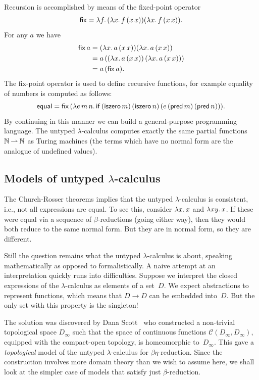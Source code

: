 %
Recursion is accomplished by means of the fixed-point operator
%
\begin{equation*}
  \mathsf{fix} = \lambda f .\,(\lambda x .\,f\,(x\,x)) (\lambda x .\,f\,(x\,x)).
\end{equation*}
%
For any $a$ we have
%
\begin{align*}
  \mathsf{fix}\,a &=
  (\lambda x .\,a\,(x\,x)) (\lambda x .\,a\,(x\,x)) \\
  &= a\,((\lambda x .\,a\,(x\,x))\,(\lambda x .\,a\,(x\,x))) \\
  &= a\,(\mathsf{fix}\,a).
\end{align*}
%
The fix-point operator is used to define recursive functions, for
example equality of numbers is computed as follows:
%
\begin{equation*}
  \mathsf{equal} = \mathsf{fix}\,(\lambda e\,m\,n .\,
    \mathsf{if}\,
    (\mathsf{iszero}\,m)\,
    (\mathsf{iszero}\,n)\,
    (e\,(\mathsf{pred}\,m)\,(\mathsf{pred}\,n))).
\end{equation*}
%
By continuing in this manner we can build a general-purpose
programming language. The untyped $\lambda$-calculus computes exactly
the same partial functions $\mathbb{N} \mathbin{\rightharpoonup} \mathbb{N}$ as Turing machines (the
terms which have no normal form are the analogue of undefined values).


\subsection{Models of untyped $\lambda$-calculus}
\label{sec:models-untyped-lambda-calculus}

The Church-Rosser theorems implies that the untyped $\lambda$-calculus
is consistent, i.e., not all expressions are equal. To see this,
consider $\lambda x .\,x$ and $\lambda x y .\,x$. If these were equal via
a sequence of $\beta$-reductions (going either way), then they would
both reduce to the same normal form. But they are in normal form, so
they are different.

Still the question remains what the untyped $\lambda$-calculus is
about, speaking mathematically as opposed to formalistically. A naive
attempt at an interpretation quickly runs into difficulties. Suppose
we interpret the closed expressions of the $\lambda$-calculus as
elements of a set~$D$. We expect abstractions to represent functions,
which means that $D \to D$ can be embedded into~$D$. But the only set
with this property is the singleton!

The solution was discovered by Dana Scott~\cite{Scott:Dinfty} who
constructed a non-trivial topological space $D_\infty$ such that the
space of continuous functions $\mathcal{C}(D_\infty, D_\infty)$,
equipped with the compact-open topology, is homeomorphic
to~$D_\infty$. This gave a \emph{topological} model of the untyped
$\lambda$-calculus for $\beta\eta$-reduction. Since the construction
involves more domain theory than we wish to assume here, we shall look
at the simpler case of models that satisfy just $\beta$-reduction.


